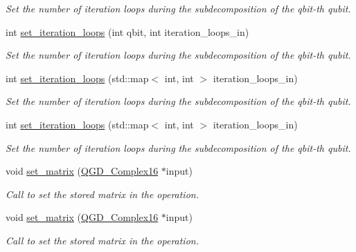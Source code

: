 \begin{DoxyCompactItemize}
\begin{DoxyCompactList}\small\item\em Set the number of iteration loops during the subdecomposition of the qbit-\/th qubit. \end{DoxyCompactList}\item 
int \hyperlink{class_decomposition___base_aaf2862ee2211dac36242551340190b4b}{set\+\_\+iteration\+\_\+loops} (int qbit, int iteration\+\_\+loops\+\_\+in)
\begin{DoxyCompactList}\small\item\em Set the number of iteration loops during the subdecomposition of the qbit-\/th qubit. \end{DoxyCompactList}\item 
int \hyperlink{class_decomposition___base_aa376f8cfdb1b9ed06bceff9c72ddf496}{set\+\_\+iteration\+\_\+loops} (std\+::map$<$ int, int $>$ iteration\+\_\+loops\+\_\+in)
\begin{DoxyCompactList}\small\item\em Set the number of iteration loops during the subdecomposition of the qbit-\/th qubit. \end{DoxyCompactList}\item 
int \hyperlink{class_decomposition___base_aa376f8cfdb1b9ed06bceff9c72ddf496}{set\+\_\+iteration\+\_\+loops} (std\+::map$<$ int, int $>$ iteration\+\_\+loops\+\_\+in)
\begin{DoxyCompactList}\small\item\em Set the number of iteration loops during the subdecomposition of the qbit-\/th qubit. \end{DoxyCompactList}\item 
void \hyperlink{class_operation_a026d3dcf0ad00af99c7a9097d3cf1c74}{set\+\_\+matrix} (\hyperlink{struct_q_g_d___complex16}{Q\+G\+D\+\_\+\+Complex16} $\ast$input)
\begin{DoxyCompactList}\small\item\em Call to set the stored matrix in the operation. \end{DoxyCompactList}\item 
void \hyperlink{class_operation_a026d3dcf0ad00af99c7a9097d3cf1c74}{set\+\_\+matrix} (\hyperlink{struct_q_g_d___complex16}{Q\+G\+D\+\_\+\+Complex16} $\ast$input)
\begin{DoxyCompactList}\small\item\em Call to set the stored matrix in the operation. \end{DoxyCompactList}\item 

\end{DoxyCompactItemize}
